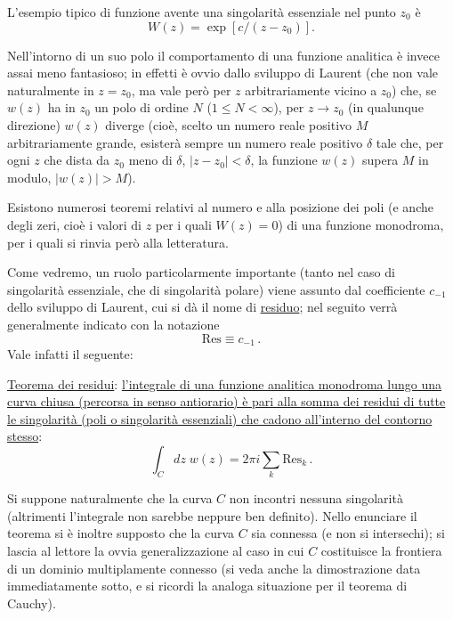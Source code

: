 \documentclass[11pt, a4paper]{book}
\numberwithin{equation}{section}
\begin{document}
L'esempio tipico di funzione avente una singolarità essenziale nel punto $z_0$ è
\begin{equation}
W(z) = \exp\!\left[c/(z - z_0)\right]. \tag{6}
\end{equation}

Nell'intorno di un suo polo il comportamento di una funzione analitica è invece assai meno fantasioso; in effetti è ovvio dallo sviluppo di Laurent (che non vale naturalmente in $z = z_0$, ma vale però per $z$ arbitrariamente vicino a $z_0$) che, se $w(z)$ ha in $z_0$ un polo di ordine $N$ ($1 \leq N < \infty$), per $z \to z_0$ (in qualunque direzione) $w(z)$ diverge (cioè, scelto un numero reale positivo $M$ arbitrariamente grande, esisterà sempre un numero reale positivo $\delta$ tale che, per ogni $z$ che dista da $z_0$ meno di $\delta$, $|z - z_0| < \delta$, la funzione $w(z)$ supera $M$ in modulo, $|w(z)| > M$).

Esistono numerosi teoremi relativi al numero e alla posizione dei poli (e anche degli zeri, cioè i valori di $z$ per i quali $W(z) = 0$) di una funzione monodroma, per i quali si rinvia però alla letteratura.

Come vedremo, un ruolo particolarmente importante (tanto nel caso di singolarità essenziale, che di singolarità polare) viene assunto dal coefficiente $c_{-1}$ dello sviluppo di Laurent, cui si dà il nome di \uline{residuo}; nel seguito verrà generalmente indicato con la notazione
\begin{equation}
\mathrm{Res} \equiv c_{-1}\,. \tag{7}
\end{equation}
Vale infatti il seguente:

\uline{Teorema dei residui}: \uline{l'integrale di una funzione analitica monodroma lungo una curva chiusa (percorsa in senso antiorario) è pari alla somma dei residui di tutte le singolarità (poli o singolarità essenziali) che cadono all'interno del contorno stesso}:
\begin{equation}
\int_C dz\; w(z) = 2\pi i \sum_k \mathrm{Res}_k\,. \tag{8}
\end{equation}

Si suppone naturalmente che la curva $C$ non incontri nessuna singolarità (altrimenti l'integrale non sarebbe neppure ben definito). Nello enunciare il teorema si è inoltre supposto che la curva $C$ sia connessa (e non si intersechi); si lascia al lettore la ovvia generalizzazione al caso in cui $C$ costituisce la frontiera di un dominio multiplamente connesso (si veda anche la dimostrazione data immediatamente sotto, e si ricordi la analoga situazione per il teorema di Cauchy).
\end{document}
